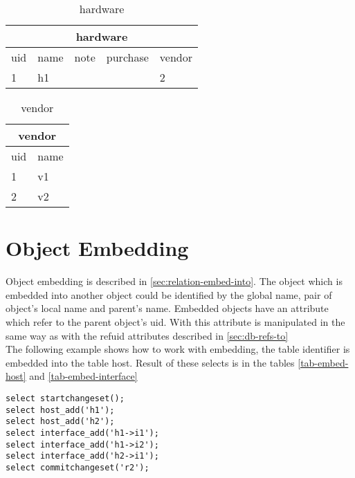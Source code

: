 \documentclass[deska]{subfiles}
\begin{document}
\begin{center}

\begin{table}
    \caption{hardware}
    \label{tab-refs-hardware}
\begin{tabular}{ | l | l | l | l | l |}
    \hline
    \multicolumn{5}{|c|}{hardware}\\
    \hline
    uid & name & note & purchase & vendor\\
    \hline
    1 & h1 &  &  & 2\\
    \hline
\end{tabular}
\end{table}

\begin{table}
    \caption{vendor}
    \label{tab-refs-vendor}
\begin{tabular}{ | l | l |}
    \hline
    \multicolumn{2}{|c|}{vendor}\\
    \hline
    uid & name \\
    \hline
    1 & v1\\
    2 & v2\\
    \hline
\end{tabular}
\end{table}

\end{center}

\section{Object Embedding}
Object embedding is described in \ref{sec:relation-embed-into}. The object which is embedded into another object could be identified by the global name, pair of object's local name and parent's name. Embedded objects have an attribute which refer to the parent object's uid. With this attribute is manipulated in the same way as with the refuid attributes described in \ref{sec:db-refs-to}\\
The following example shows how to work with embedding, the table identifier is embedded into the table host. Result of these selects is in the tables \ref{tab-embed-host} and \ref{tab-embed-interface}

\begin{verbatim}
select startchangeset();
select host_add('h1');
select host_add('h2');
select interface_add('h1->i1');
select interface_add('h1->i2');
select interface_add('h2->i1');
select commitchangeset('r2');
\end{verbatim}
\end{document}
